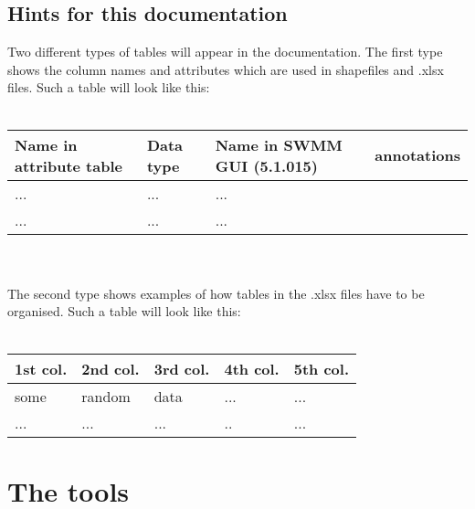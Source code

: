 \documentclass[10pt,a4paper,oneside]{scrbook}
\begin{document}
\section{Hints for this documentation}
Two different types of tables will appear in the documentation. The first type shows the column names and attributes which are used in shapefiles and .xlsx files. Such a table will look like this:\\
\\
\begin{tabular}{p{1.7cm}|p{1.3cm}|P{3cm}|P{8cm}}
\hline 
\textbf{Name in attribute table} & \textbf{Data type} & \textbf{Name in SWMM GUI (5.1.015)} & \textbf{annotations}\\ 
\hline 
... & ... & ... & \\
... & ... & ... & \\
\hline
\end{tabular}
\\
\\
The second type shows examples of how tables in the .xlsx files have to be organised. Such a table will look like this:\\
\\
\begin{tabular}{|p{1.7cm}|p{1.7cm}|P{1.7cm}|P{1.7cm}|P{1.7cm}|}
\hline 
\textbf{1st col.} & \textbf{2nd col.} & \textbf{3rd col.} & \textbf{4th col.} & \textbf{5th col.}\\ 
\hline 
some & random & data & ... &...\\
\hline
... & ... & ...& .. &...\\
\hline
\end{tabular}

\chapter{The tools}
\end{document}
